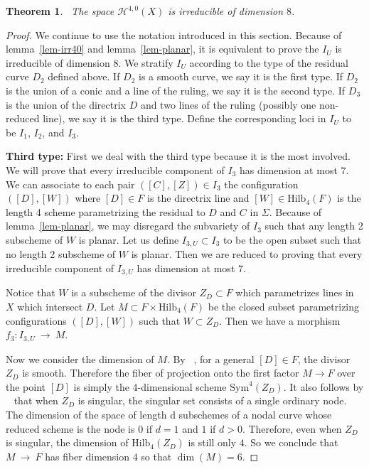 \documentclass[twoside,12pt,reqno]{amsart}
\theoremstyle{plain}
\newtheorem{thm}{Theorem}[section]
\theoremstyle{definition}
\newcommand{\Hdg}[2]{\mathcal{H}^{#1,#2}}
\newcommand{\HI}[2]{\text{Hilb}_{#1}(#2)}
\def\ps{\vspace{4pt}}
\begin{document}
\ps

\begin{thm}~\label{thm-irr40} The space $\Hdg{4}{0}(X)$ is
irreducible of dimension $8$. 
\end{thm}

\begin{proof} 
We continue to use the notation introduced in this section.
Because of lemma~\ref{lem-irr40} and lemma~\ref{lem-planar}, it is
equivalent to prove the $I_U$ is irreducible of dimension $8$.  
We stratify $I_U$ according to the type of
the residual curve $D_2$ defined above.  If $D_2$ is a smooth curve,
we say it is the first type.  If $D_2$ is the union of a conic and a
line of the ruling, we say it is the second type.  If $D_3$ is the
union of the directrix $D$ and two lines of the ruling (possibly one
non-reduced line), we say it is the third type.  Define the
corresponding loci in $I_U$ to be $I_1$, $I_2$, and $I_3$.

\ps

\textbf{Third type:}
First we deal with the third type because it is the most involved.  
We will prove that every irreducible component of $I_3$ has dimension
at most $7$.
We 
can associate to each pair $([C],[Z])\in I_3$ the configuration
$([D],[W])$ where $[D]\in F$ is the directrix line and $[W]\in
\HI{4}{F}$ is the length 4 scheme parametrizing the residual to $D$
and $C$ in $\Sigma$.  
Because of lemma~\ref{lem-planar}, we may disregard the subvariety of
$I_3$ such that any length 2 subscheme of $W$ is planar.  Let us
define $I_{3,U}\subset I_3$ to be the open subset such that no length
2 subscheme of $W$ is planar.  Then we are reduced to proving that
every irreducible component of $I_{3,U}$ has dimension at most $7$.

\ps

Notice that $W$ is a subscheme of the divisor
$Z_D\subset F$ which parametrizes lines in $X$ which intersect $D$.
Let $M\subset F\times\HI{4}{F}$ be the closed subset parametrizing
configurations $([D],[W])$ such that $W\subset Z_D$.  Then we have a
morphism $f_3:I_{3,U}~\rightarrow~M$.

\ps

Now we consider the dimension of $M$.  By ~\cite[lemma 10.5]{CG}, for
a general $[D]\in F$, the divisor $Z_D$ is smooth.  Therefore the
fiber of projection onto the first factor $M\rightarrow F$ over the
point $[D]$ is simply the 4-dimensional scheme $\text{Sym}^4(Z_D)$.
It also follows by ~\cite[lemma 10.5]{CG} that when $Z_D$ is singular, 
the singular set consists of a single ordinary node.  The dimension of 
the space of length d subschemes of a nodal curve whose reduced scheme 
is the node is $0$ if $d=1$ and $1$ if $d>0$.  Therefore, even when
$Z_D$ is singular, the dimension of $\HI{4}{Z_D}$ is still only $4$.
So we conclude that $M~\rightarrow~F$ has fiber dimension $4$ so that
$\dim (M) = 6$.


\end{proof}
\end{document}
